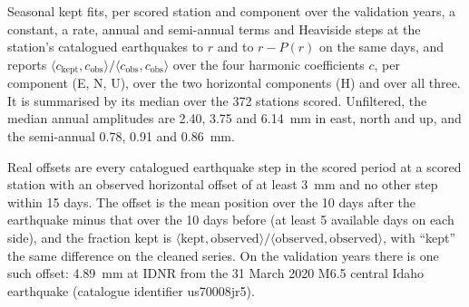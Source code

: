\documentclass[preprint,12pt,authoryear]{elsarticle}
\begin{document}
Seasonal kept fits, per scored station and component over the validation years, a constant, a rate, annual and semi-annual terms and Heaviside steps at the station's catalogued earthquakes to $r$ and to $r - P(r)$ on the same days, and reports $\langle c_{\mathrm{kept}}, c_{\mathrm{obs}} \rangle / \langle c_{\mathrm{obs}}, c_{\mathrm{obs}} \rangle$ over the four harmonic coefficients $c$, per component (E, N, U), over the two horizontal components (H) and over all three. It is summarised by its median over the 372 stations scored. Unfiltered, the median annual amplitudes are 2.40, 3.75 and 6.14~mm in east, north and up, and the semi-annual 0.78, 0.91 and 0.86~mm.

Real offsets are every catalogued earthquake step in the scored period at a scored station with an observed horizontal offset of at least 3~mm and no other step within 15 days. The offset is the mean position over the 10 days after the earthquake minus that over the 10 days before (at least 5 available days on each side), and the fraction kept is $\langle \text{kept}, \text{observed} \rangle / \langle \text{observed}, \text{observed} \rangle$, with ``kept'' the same difference on the cleaned series. On the validation years there is one such offset: 4.89~mm at IDNR from the 31 March 2020 M6.5 central Idaho earthquake (catalogue identifier us70008jr5).
\end{document}
